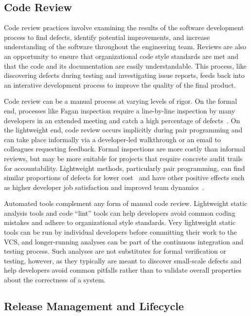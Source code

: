 \subsection{Code Review}

Code review practices involve examining the results of the software
development process to find defects, identify potential improvements,
and increase understanding of the software throughout the engineering
team. Reviews are also an opportunity to ensure that organizational
code style standards are met and that the code and its documentation
are easily understandable. This process, like discovering defects
during testing and investigating issue reports, feeds back into an
interative development process to improve the quality of the final
product.

Code review can be a manual process at varying levels of rigor. On the
formal end, processes like Fagan inspection require a line-by-line
inspection by many developers in an extended meeting and catch a high
percentage of defects~\cite{fagan2002design}. On the lightweight end,
code review occurs implicitly during pair programming and can take
place informally via a developer-led walkthrough or an email to
colleagues requesting feedback. Formal inspections are more costly
than informal reviews, but may be more suitable for projects that
require concrete audit trails for accountability. Lightweight methods,
particularly pair programming, can find similar proportions of defects
for lower cost~\cite{tomayko2002comparison} and have other positive
effects such as higher developer job satisfaction and improved team
dynamics~\cite{cockburn2000costs}.

Automated tools complement any form of manual code review. Lightweight
static analysis tools and code ``lint'' tools can help developers
avoid common coding mistakes and adhere to organizational style
standards. Very lightweight static tools can be run by individual
developers before committing their work to the VCS, and longer-running
analyses can be part of the continuous integration and testing
process. Such analyses are not substitutes for formal verification or
testing, however, as they typically are meant to discover small-scale
defects and help developers avoid common pitfalls rather than to
validate overall properties about the correctness of a system.

\subsection{Release Management and Lifecycle}

